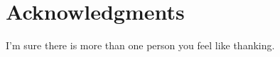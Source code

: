 \chapter*{Acknowledgments}

I'm sure there is more than one person you feel like thanking.

\vspace{10mm}
